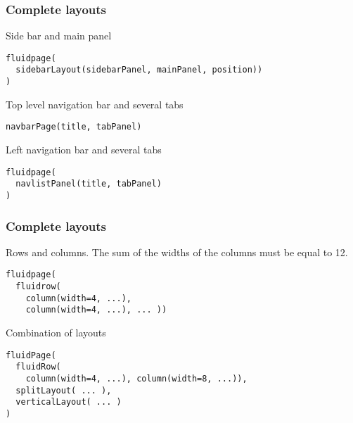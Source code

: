 \documentclass{beamer}
\begin{document}
	\begin{frame}[fragile]
		\frametitle{Complete layouts}
		
		Side bar and main panel
		\begin{exampleblock}{}
		\begin{BVerbatim}
fluidpage(
  sidebarLayout(sidebarPanel, mainPanel, position))
)
		\end{BVerbatim}
		\end{exampleblock}{}

		\vspace{1em}

		Top level navigation bar and several tabs
		\begin{exampleblock}{}
		\begin{BVerbatim}
navbarPage(title, tabPanel)
		\end{BVerbatim}
		\end{exampleblock}{}

		\vspace{1em}

		Left navigation bar and several tabs
		\begin{exampleblock}{}
		\begin{BVerbatim}
fluidpage(
  navlistPanel(title, tabPanel)
)
		\end{BVerbatim}
		\end{exampleblock}{}

	\end{frame}

	\begin{frame}[fragile]
		\frametitle{Complete layouts}
		
		Rows and columns. The sum of the widths of the columns must be equal to 12.
		\begin{exampleblock}{}
		\begin{BVerbatim}
fluidpage(
  fluidrow(
    column(width=4, ...),
    column(width=4, ...), ... ))
		\end{BVerbatim}
		\end{exampleblock}{}

		\vspace{1em}

		Combination of layouts
		\begin{exampleblock}{}
		\begin{BVerbatim}
fluidPage(
  fluidRow(
    column(width=4, ...), column(width=8, ...)),
  splitLayout( ... ),
  verticalLayout( ... )
)
		\end{BVerbatim}
		\end{exampleblock}{}

	\end{frame}
\end{document}
